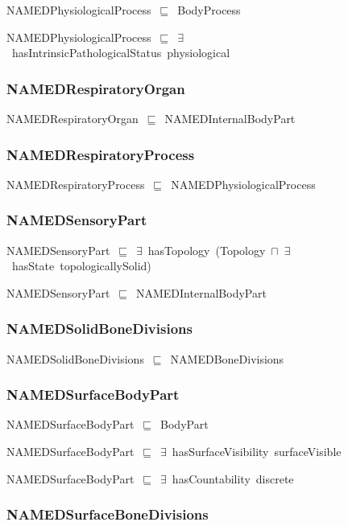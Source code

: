 \documentclass{article}
\begin{document}
NAMEDPhysiologicalProcess~\ensuremath{\sqsubseteq}~BodyProcess~

NAMEDPhysiologicalProcess~\ensuremath{\sqsubseteq}~\ensuremath{\exists}~hasIntrinsicPathologicalStatus~physiological~

\subsubsection*{NAMEDRespiratoryOrgan}

NAMEDRespiratoryOrgan~\ensuremath{\sqsubseteq}~NAMEDInternalBodyPart~

\subsubsection*{NAMEDRespiratoryProcess}

NAMEDRespiratoryProcess~\ensuremath{\sqsubseteq}~NAMEDPhysiologicalProcess~

\subsubsection*{NAMEDSensoryPart}

NAMEDSensoryPart~\ensuremath{\sqsubseteq}~\ensuremath{\exists}~hasTopology~(Topology~\ensuremath{\sqcap}~\ensuremath{\exists}~hasState~topologicallySolid)~

NAMEDSensoryPart~\ensuremath{\sqsubseteq}~NAMEDInternalBodyPart~

\subsubsection*{NAMEDSolidBoneDivisions}

NAMEDSolidBoneDivisions~\ensuremath{\sqsubseteq}~NAMEDBoneDivisions~

\subsubsection*{NAMEDSurfaceBodyPart}

NAMEDSurfaceBodyPart~\ensuremath{\sqsubseteq}~BodyPart~

NAMEDSurfaceBodyPart~\ensuremath{\sqsubseteq}~\ensuremath{\exists}~hasSurfaceVisibility~surfaceVisible~

NAMEDSurfaceBodyPart~\ensuremath{\sqsubseteq}~\ensuremath{\exists}~hasCountability~discrete~

\subsubsection*{NAMEDSurfaceBoneDivisions}
\end{document}
